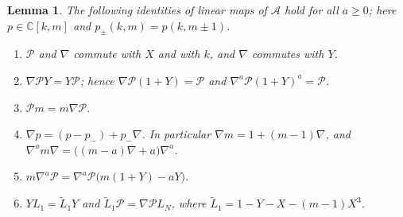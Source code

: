 \documentclass[11pt]{amsart}
\newtheorem{lemma}[theorem]{Lemma}
\theoremstyle{definition}
\newcommand{\C}{\mathbb{C}}
\begin{document}
\begin{lemma}\label{lem:Pid}
The following identities of linear maps of $\mathcal A$ hold for all $a\ge0$; here $p\in\C[k,m]$ and $p_\pm(k,m)=p(k,m\pm1)$.
\begin{enumerate}
\item $\mathcal P$ and $\nabla$ commute with $X$ and with $k$, and $\nabla$ commutes with $Y$.
\item $\nabla\mathcal PY=Y\mathcal P$; hence $\nabla\mathcal P(1+Y)=\mathcal P$ and $\nabla^a\mathcal P(1+Y)^a=\mathcal P$.
\item $\mathcal Pm=m\nabla\mathcal P$.
\item $\nabla p=(p-p_-)+p_-\nabla$. In particular $\nabla m=1+(m-1)\nabla$, and $\nabla^am\nabla=\bigl((m-a)\nabla+a\bigr)\nabla^a$.
\item $m\nabla^a\mathcal P=\nabla^a\mathcal P\bigl(m(1+Y)-aY\bigr)$.
\item $YL_1=\widetilde L_1Y$ and $\widetilde L_1\mathcal P=\nabla\mathcal PL_N$, where $\widetilde L_1=1-Y-X-(m-1)X^3$.
\end{enumerate}
\end{lemma}
\end{document}
